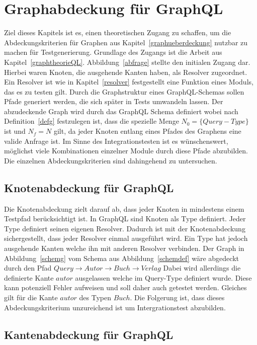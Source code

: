 \chapter{Graphabdeckung für GraphQL}
\label{gqlcov}

Ziel dieses Kapitels ist es, einen theoretischen Zugang zu schaffen, um die Abdeckungskriterien für Graphen aus Kapitel~\ref{graphueberdeckung} nutzbar zu machen für Testgenerierung.
Grundlage des Zugangs ist die Arbeit aus Kapitel~\ref{graphtheorieQL}.
Abbildung~\ref{abfrage} stellte den initialen Zugang dar.
Hierbei waren Knoten, die ausgehende Kanten haben, als Resolver zugeordnet.
Ein Resolver ist wie in Kapitel~\ref{resolver} festgestellt eine Funktion eines Moduls, das es zu testen gilt.
Durch die Graphstruktur eines GraphQL-Schemas sollen Pfade generiert werden, die sich später in Tests umwandeln lassen.
Der abzudeckende Graph wird durch das GraphQL Schema definiert wobei nach Definition~\ref{defg} festzulegen ist,
dass die spezielle Menge $N_{0} = \{ Query-Type \}$ ist und $N_{f} = N$ gilt, da jeder Knoten entlang eines Pfades des Graphens eine valide Anfrage ist.
Im Sinne des Integrationstesten ist es wünschenswert, möglichst viele Kombinationen einzelner Module durch diese Pfade abzubilden.
Die einzelnen Abdeckungskriterien sind dahingehend zu untersuchen.


\section{Knotenabdeckung für GraphQL}

Die Knotenabdeckung zielt darauf ab, dass jeder Knoten in mindestens einem Testpfad berücksichtigt ist.
In GraphQL sind Knoten als Type definiert.
Jeder Type definiert seinen eigenen Resolver.
Dadurch ist mit der Knotenabdeckung sichergestellt, dass jeder Resolver einmal ausgeführt wird.
Ein Type hat jedoch ausgehende Kanten welche ihn mit anderen Resolver verbinden.
Der Graph in Abbildung~\ref{schemg} vom Schema aus Abbildung~\ref{schemdef} wäre abgedeckt durch den Pfad
$ Query \rightarrow Autor \rightarrow Buch \rightarrow Verlag $
Dabei wird allerdings die definierte Kante $autor$ ausgelassen welche im Query-Type definiert wurde.
Diese kann potenziell Fehler aufweisen und soll daher auch getestet werden.
Gleiches gilt für die Kante $autor$ des Typen $Buch$.
Die Folgerung ist, dass dieses Abdeckungskriterium unzureichend ist um Intergrationstest abzubilden.

\section{Kantenabdeckung für GraphQL}

